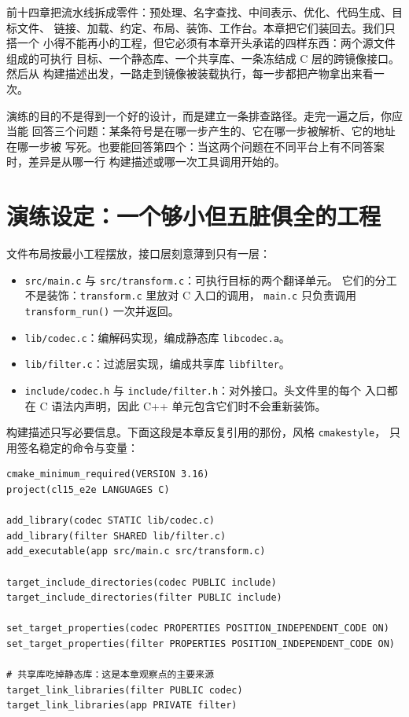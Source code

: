 \documentclass[12pt,a4paper,fontset=fandol]{ctexbook}
\newcommand{\cpp}[1]{C++#1}
\newcommand{\Fn}[1]{\texttt{#1()}}
\newcommand{\Tp}[1]{\texttt{#1}}
\newcommand{\Lang}[1]{\textsf{#1}}
\newcommand{\CL}{\Lang{C}}
\begin{document}
前十四章把流水线拆成零件：预处理、名字查找、中间表示、优化、代码生成、目标文件、
链接、加载、约定、布局、装饰、工作台。本章把它们装回去。我们只搭一个
小得不能再小的工程，但它必须有本章开头承诺的四样东西：两个源文件组成的可执行
目标、一个静态库、一个共享库、一条冻结成 \CL{} 层的跨镜像接口。然后从
构建描述出发，一路走到镜像被装载执行，每一步都把产物拿出来看一次。

演练的目的不是得到一个好的设计，而是建立一条排查路径。走完一遍之后，你应当能
回答三个问题：某条符号是在哪一步产生的、它在哪一步被解析、它的地址在哪一步被
写死。也要能回答第四个：当这两个问题在不同平台上有不同答案时，差异是从哪一行
构建描述或哪一次工具调用开始的。

\section{演练设定：一个够小但五脏俱全的工程}\label{sec:cl15-setup}

文件布局按最小工程摆放，接口层刻意薄到只有一层：

\begin{itemize}
\item \Tp{src/main.c} 与 \Tp{src/transform.c}：可执行目标的两个翻译单元。
      它们的分工不是装饰：\Tp{transform.c} 里放对 \CL{} 入口的调用，
      \Tp{main.c} 只负责调用 \Fn{transform\_run} 一次并返回。
\item \Tp{lib/codec.c}：编解码实现，编成静态库 \Tp{libcodec.a}。
\item \Tp{lib/filter.c}：过滤层实现，编成共享库 \Tp{libfilter}。
\item \Tp{include/codec.h} 与 \Tp{include/filter.h}：对外接口。头文件里的每个
      入口都在 \CL{} 语法内声明，因此 \cpp{} 单元包含它们时不会重新装饰。
\end{itemize}

构建描述只写必要信息。下面这段是本章反复引用的那份，风格 \Tp{cmakestyle}，
只用签名稳定的命令与变量：

\begin{lstlisting}[style=cmakestyle, caption={演练工程唯一的构建描述：两个源文件的可执行目标、一个静态库、一个共享库}]
cmake_minimum_required(VERSION 3.16)
project(cl15_e2e LANGUAGES C)

add_library(codec STATIC lib/codec.c)
add_library(filter SHARED lib/filter.c)
add_executable(app src/main.c src/transform.c)

target_include_directories(codec PUBLIC include)
target_include_directories(filter PUBLIC include)

set_target_properties(codec PROPERTIES POSITION_INDEPENDENT_CODE ON)
set_target_properties(filter PROPERTIES POSITION_INDEPENDENT_CODE ON)

# 共享库吃掉静态库：这是本章观察点的主要来源
target_link_libraries(filter PUBLIC codec)
target_link_libraries(app PRIVATE filter)
\end{lstlisting}
\end{document}
